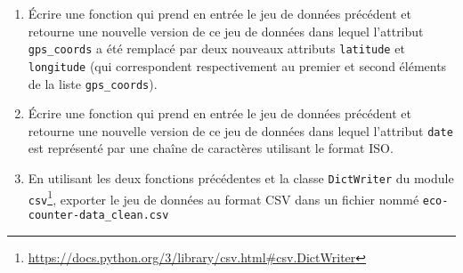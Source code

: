 \documentclass[11pt,a4paper]{article}
\begin{document}
\begin{enumerate}
    \item Écrire une fonction qui prend en entrée le jeu de données précédent et retourne une nouvelle version de ce jeu de données dans lequel l'attribut \verb+gps_coords+ a été remplacé par deux nouveaux attributs \verb+latitude+ et \verb+longitude+ (qui correspondent respectivement au premier et second éléments de la liste \verb+gps_coords+).
    
    \item Écrire une fonction qui prend en entrée le jeu de données précédent et retourne une nouvelle version de ce jeu de données dans lequel l'attribut \verb+date+ est représenté par une chaîne de caractères utilisant le format ISO.
    
    \item En utilisant les deux fonctions précédentes et la classe \verb+DictWriter+ du module \verb+csv+\footnote{\url{https://docs.python.org/3/library/csv.html\#csv.DictWriter}}, exporter le jeu de données au format CSV dans un fichier nommé \verb+eco-counter-data_clean.csv+
\end{enumerate}
\end{document}
